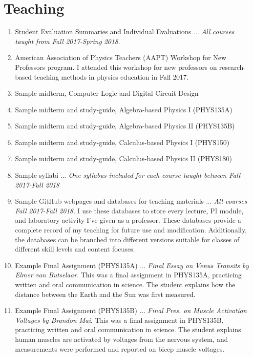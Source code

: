 \documentclass[../../main.tex]{subfiles}
\begin{document}
\section{Teaching}

\begin{enumerate}
\item Student Evaluation Summaries and Individual Evaluations ... \textit{All courses taught from Fall 2017-Spring 2018}.
\item American Association of Physics Teachers (AAPT) Workshop for New Professors program.  I attended this workshop for new professors on research-based teaching methods in physics education in Fall 2017.
\item Sample midterm, Computer Logic and Digital Circuit Design
\item Sample midterm and study-guide, Algebra-based Physics I (PHYS135A)
\item Sample midterm and study-guide, Algebra-based Physics II (PHYS135B)
\item Sample midterm and study-guide, Calculus-based Physics I (PHYS150)
\item Sample midterm and study-guide, Calculus-based Physics II (PHYS180)
\item Sample syllabi ... \textit{One syllabus included for each course taught between Fall 2017-Fall 2018}
\item Sample GitHub webpages and databases for teaching materials ... \textit{All courses Fall 2017-Fall 2018}.  I use these databases to store every lecture, PI module, and laboratory activity I've given as a professor.  These databases provide a complete record of my teaching for future use and modification.  Additionally, the databases can be branched into different versions suitable for classes of different skill levels and content focuses.
\item Example Final Assignment (PHYS135A) ... \textit{Final Essay on Venus Transits by Elmer van Butselaar}.  This was a final assignment in PHYS135A, practicing written and oral communication in science.  The student explains how the distance between the Earth and the Sun was first measured.
\item Example Final Assignment (PHYS135B) ... \textit{Final Pres. on Muscle Activation Voltages by Brandon Mai}.  This was a final assignment in PHYS135B, practicing written and oral communication in science.  The student explains human muscles are activated by voltages from the nervous system, and measurements were performed and reported on bicep muscle voltages.

\end{enumerate}
\end{document}
